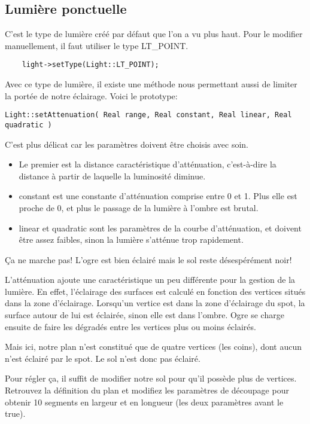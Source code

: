 \subsection{Lumière ponctuelle}
C'est le type de lumière créé par défaut que l'on a vu plus haut. Pour le modifier manuellement, il faut utiliser le type LT\_POINT.

\begin{lstlisting}
	light->setType(Light::LT_POINT);
\end{lstlisting}


Avec ce type de lumière, il existe une méthode nous permettant aussi de limiter la portée de notre éclairage. Voici le prototype:
\begin{lstlisting}
Light::setAttenuation( Real range, Real constant, Real linear, Real quadratic )
\end{lstlisting}



C'est plus délicat car les paramètres doivent être choisis avec soin. 
\begin{itemize}
\item Le premier est la distance caractéristique d'atténuation, c'est-à-dire la distance à partir de laquelle la luminosité diminue. 
\item constant est une constante d'atténuation comprise entre 0 et 1. Plus elle est proche de 0, et plus le passage de la lumière à l'ombre est brutal.
\item linear et quadratic sont les paramètres de la courbe d'atténuation, et doivent être assez faibles, sinon la lumière s'atténue trop rapidement.
\end{itemize}
	


Ça ne marche pas! L'ogre est bien éclairé mais le sol reste désespérément noir!

L'atténuation ajoute une caractéristique un peu différente pour la gestion de la lumière. En effet, l'éclairage des surfaces est calculé en fonction des vertices situés dans la zone d'éclairage. Lorsqu'un vertice est dans la zone d'éclairage du spot, la surface autour de lui est éclairée, sinon elle est dans l'ombre. Ogre se charge ensuite de faire les dégradés entre les vertices plus ou moins éclairés.

Mais ici, notre plan n'est constitué que de quatre vertices (les coins), dont aucun n'est éclairé par le spot. Le sol n'est donc pas éclairé.

Pour régler ça, il suffit de modifier notre sol pour qu'il possède plus de vertices. Retrouvez la définition du plan et modifiez les paramètres de découpage pour obtenir 10 segments en largeur et en longueur (les deux paramètres avant le true).

